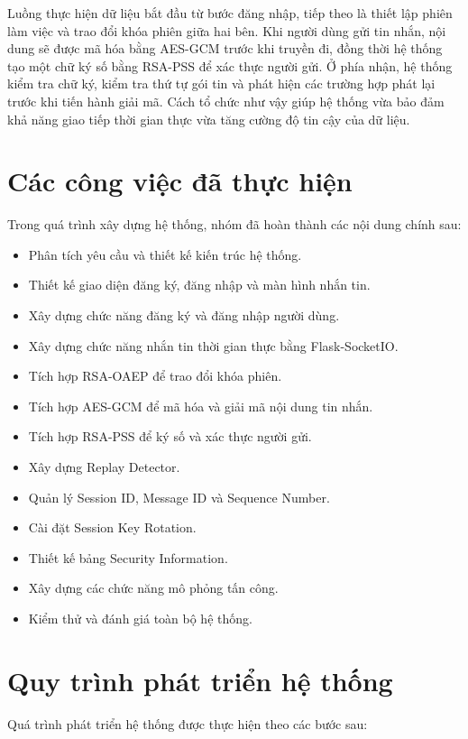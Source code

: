 Luồng thực hiện dữ liệu bắt đầu từ bước đăng nhập, tiếp theo là thiết lập phiên làm việc và trao đổi khóa phiên giữa hai bên. Khi người dùng gửi tin nhắn, nội dung sẽ được mã hóa bằng AES-GCM trước khi truyền đi, đồng thời hệ thống tạo một chữ ký số bằng RSA-PSS để xác thực người gửi. Ở phía nhận, hệ thống kiểm tra chữ ký, kiểm tra thứ tự gói tin và phát hiện các trường hợp phát lại trước khi tiến hành giải mã. Cách tổ chức như vậy giúp hệ thống vừa bảo đảm khả năng giao tiếp thời gian thực vừa tăng cường độ tin cậy của dữ liệu.

\section{Các công việc đã thực hiện}

Trong quá trình xây dựng hệ thống, nhóm đã hoàn thành các nội dung chính sau:

\begin{itemize}
\item Phân tích yêu cầu và thiết kế kiến trúc hệ thống.
\item Thiết kế giao diện đăng ký, đăng nhập và màn hình nhắn tin.
\item Xây dựng chức năng đăng ký và đăng nhập người dùng.
\item Xây dựng chức năng nhắn tin thời gian thực bằng Flask-SocketIO.
\item Tích hợp RSA-OAEP để trao đổi khóa phiên.
\item Tích hợp AES-GCM để mã hóa và giải mã nội dung tin nhắn.
\item Tích hợp RSA-PSS để ký số và xác thực người gửi.
\item Xây dựng Replay Detector.
\item Quản lý Session ID, Message ID và Sequence Number.
\item Cài đặt Session Key Rotation.
\item Thiết kế bảng Security Information.
\item Xây dựng các chức năng mô phỏng tấn công.
\item Kiểm thử và đánh giá toàn bộ hệ thống.
\end{itemize}

\section{Quy trình phát triển hệ thống}

Quá trình phát triển hệ thống được thực hiện theo các bước sau:

